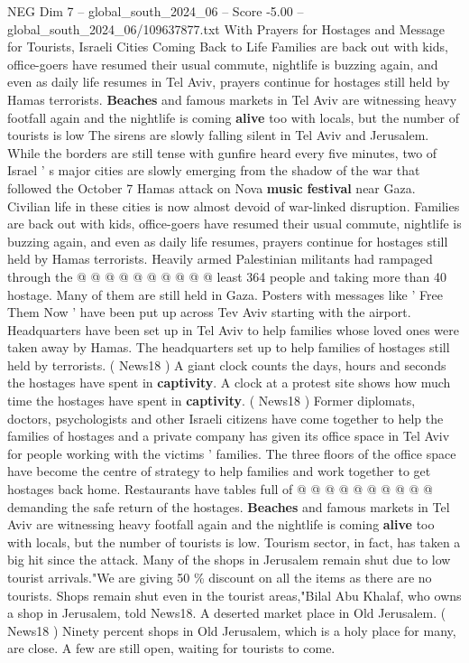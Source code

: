 \begin{textsample}{NEG Dim 7 – global\_south\_2024\_06 – Score -5.00 – global\_south\_2024\_06/109637877.txt}  \label{ex:f7_neg_369}
With Prayers for Hostages and Message for Tourists, Israeli Cities Coming Back to Life Families are back out with kids, office-goers have resumed their usual commute, nightlife is buzzing again, and even as daily life resumes in Tel Aviv, prayers continue for hostages still held by Hamas terrorists. \textbf{Beaches} and famous markets in Tel Aviv are witnessing heavy footfall again and the nightlife is coming \textbf{alive} too with locals, but the number of tourists is low The sirens are slowly falling silent in Tel Aviv and Jerusalem.
While the borders are still tense with gunfire heard every five minutes, two of Israel ' s major cities are slowly emerging from the shadow of the war that followed the October 7 Hamas attack on Nova \textbf{music} \textbf{festival} near Gaza.
Civilian life in these cities is now almost devoid of war-linked disruption.
Families are back out with kids, office-goers have resumed their usual commute, nightlife is buzzing again, and even as daily life resumes, prayers continue for hostages still held by Hamas terrorists.
Heavily armed Palestinian militants had rampaged through the @ @ @ @ @ @ @ @ @ @ least 364 people and taking more than 40 hostage.
Many of them are still held in Gaza.
Posters with messages like ' Free Them Now ' have been put up across Tev Aviv starting with the airport.
Headquarters have been set up in Tel Aviv to help families whose loved ones were taken away by Hamas.
The headquarters set up to help families of hostages still held by terrorists. ( News18 ) A giant clock counts the days, hours and seconds the hostages have spent in \textbf{captivity}.
A clock at a protest site shows how much time the hostages have spent in \textbf{captivity}. ( News18 ) Former diplomats, doctors, psychologists and other Israeli citizens have come together to help the families of hostages and a private company has given its office space in Tel Aviv for people working with the victims ' families.
The three floors of the office space have become the centre of strategy to help families and work together to get hostages back home.
Restaurants have tables full of @ @ @ @ @ @ @ @ @ @ demanding the safe return of the hostages. \textbf{Beaches} and famous markets in Tel Aviv are witnessing heavy footfall again and the nightlife is coming \textbf{alive} too with locals, but the number of tourists is low.
Tourism sector, in fact, has taken a big hit since the attack.
Many of the shops in Jerusalem remain shut due to low tourist arrivals."We are giving 50 \% discount on all the items as there are no tourists.
Shops remain shut even in the tourist areas,"Bilal Abu Khalaf, who owns a shop in Jerusalem, told News18.
A deserted market place in Old Jerusalem. ( News18 ) Ninety percent shops in Old Jerusalem, which is a holy place for many, are close.
A few are still open, waiting for tourists to come.

\end{textsample}
